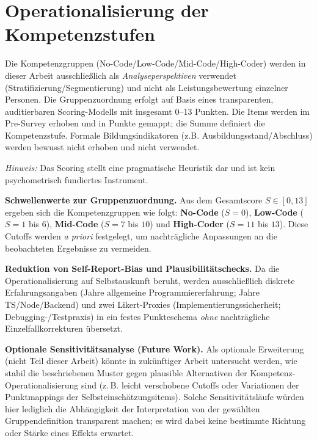 \section{Operationalisierung der Kompetenzstufen}

Die Kompetenzgruppen (No-Code/Low-Code/Mid-Code/High-Coder) werden in dieser Arbeit ausschlie\ss{}lich als \emph{Analyseperspektiven} verwendet (Stratifizierung/Segmentierung) und nicht als Leistungsbewertung einzelner Personen. Die Gruppenzuordnung erfolgt auf Basis eines transparenten, auditierbaren Scoring-Modells mit insgesamt 0--13 Punkten. Die Items werden im Pre-Survey erhoben und in Punkte gemappt; die Summe definiert die Kompetenzstufe. Formale Bildungsindikatoren (z.B. Ausbildungsstand/Abschluss) werden bewusst nicht erhoben und nicht verwendet.

\noindent\emph{Hinweis:} Das Scoring stellt eine pragmatische Heuristik dar und ist kein psychometrisch fundiertes Instrument.

\noindent \textbf{Schwellenwerte zur Gruppenzuordnung.} Aus dem Gesamtscore \(S\in[0,13]\) ergeben sich die Kompetenzgruppen wie folgt:  \textbf{No-Code} (\(S=0\)),  \textbf{Low-Code} (\(S=1\) bis \(6\)),  \textbf{Mid-Code} (\(S=7\) bis \(10\)) und  \textbf{High-Coder} (\(S=11\) bis \(13\)). Diese Cutoffs werden \emph{a priori} festgelegt, um nachtr\"agliche Anpassungen an die beobachteten Ergebnisse zu vermeiden.


\noindent \textbf{Reduktion von Self-Report-Bias und Plausibilit\"atschecks.} Da die Operationalisierung auf Selbstauskunft beruht, werden ausschlie\ss{}lich diskrete Erfahrungsangaben (Jahre allgemeine Programmiererfahrung; Jahre TS/Node/Backend) und zwei Likert-Proxies (Implementierungssicherheit; Debugging-/Testpraxis) in ein festes Punkteschema \emph{ohne} nachtr\"agliche Einzelfallkorrekturen \"ubersetzt.

\noindent \textbf{Optionale Sensitivit\"atsanalyse (Future Work).} Als optionale Erweiterung (nicht Teil dieser Arbeit) k\"onnte in zuk\"unftiger Arbeit untersucht werden, wie stabil die beschriebenen Muster gegen plausible Alternativen der Kompetenz-Operationalisierung sind (z.\,B. leicht verschobene Cutoffs oder Variationen der Punktmappings der Selbsteinsch\"atzungsitems). Solche Sensitivit\"atsl\"aufe w\"urden hier lediglich die Abh\"angigkeit der Interpretation von der gew\"ahlten Gruppendefinition transparent machen; es wird dabei keine bestimmte Richtung oder St\"arke eines Effekts erwartet.


